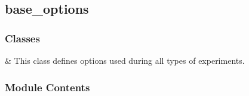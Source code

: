 \documentclass[letterpaper,10pt,english]{sphinxmanual}
\begin{document}

\begin{fulllineitems}
\label{\detokenize{autoapi/OMOP_match/index:OMOP_match.run}}
\pysigstartsignatures
{}
\pysigstopsignatures
\end{fulllineitems}


\sphinxstepscope


\subsection{base\_options}
\label{\detokenize{autoapi/base_options/index:module-base_options}}\label{\detokenize{autoapi/base_options/index:base-options}}\label{\detokenize{autoapi/base_options/index::doc}}

\subsubsection{Classes}
\label{\detokenize{autoapi/base_options/index:classes}}

\begin{savenotes}\sphinxattablestart
\sphinxthistablewithglobalstyle
\sphinxthistablewithnovlinesstyle
\centering
\begin{tabulary}{\linewidth}[t]{}
\sphinxtoprule
\sphinxtableatstartofbodyhook
\sphinxAtStartPar
{}
&
\sphinxAtStartPar
This class defines options used during all types of experiments.
\\
\sphinxbottomrule
\end{tabulary}
\sphinxtableafterendhook\par
\sphinxattableend\end{savenotes}


\subsubsection{Module Contents}
\label{\detokenize{autoapi/base_options/index:module-contents}}
\end{document}
